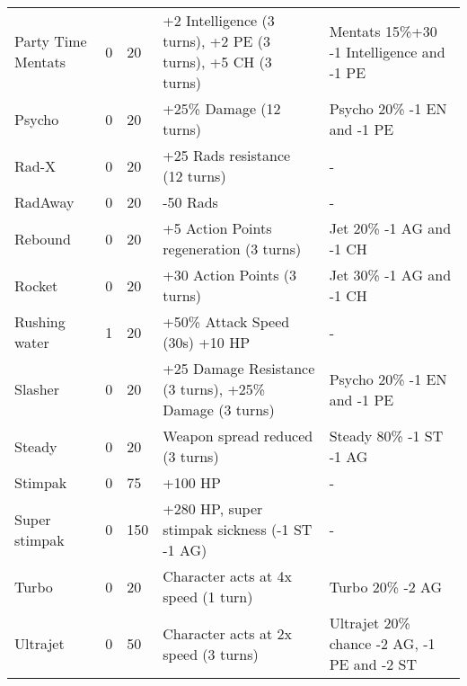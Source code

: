 \begin{longtable}{|p{4cm}|p{1.2cm}|p{1.2cm}|p{4cm}|p{4cm}|}
Party Time Mentats & 0 & 20 & +2 Intelligence (3 turns), +2 PE (3 turns), +5 CH (3 turns) & Mentats 15\%+30 -1 Intelligence and -1 PE \\
Psycho & 0 & 20 & +25\% Damage (12 turns) & Psycho 20\% -1 EN and -1 PE \\
Rad-X & 0 & 20 & +25 Rads resistance (12 turns) & - \\
RadAway & 0 & 20 & -50 Rads & - \\
Rebound & 0 & 20 & +5 Action Points regeneration (3 turns) & Jet 20\% -1 AG and -1 CH \\
Rocket & 0 & 20 & +30 Action Points (3 turns) & Jet 30\% -1 AG and -1 CH \\
Rushing water & 1 & 20 & +50\% Attack Speed (30s) +10 HP & - \\
Slasher & 0 & 20 & +25 Damage Resistance (3 turns), +25\% Damage (3 turns) & Psycho 20\% -1 EN and -1 PE \\
Steady & 0 & 20 & Weapon spread reduced (3 turns) & Steady 80\% -1 ST -1 AG \\
Stimpak & 0 & 75 & +100 HP & - \\
Super stimpak & 0 & 150 & +280 HP, super stimpak sickness (-1 ST -1 AG) & - \\
Turbo & 0 & 20 & Character acts at 4x speed (1 turn) & Turbo 20\% -2 AG \\
Ultrajet & 0 & 50 & Character acts at 2x speed (3 turns) & Ultrajet 20\% chance -2 AG, -1 PE and -2 ST \\
\hline
\end{longtable}
